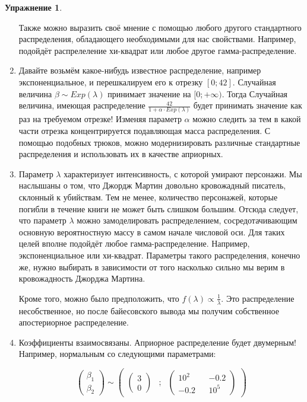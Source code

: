 \documentclass[12pt, a4paper, oneside]{extreport}
\def \b{\beta}
\theoremstyle{plain}              %
\theoremstyle{definition}         %
\newtheorem{problem}{\color{myblue} Упражнение}
\begin{document}
\begin{problem}
\begin{sol}
\begin{enumerate}
Также можно выразить своё мнение с помощью любого другого стандартного распределения, обладающего необходимыми для нас свойствами. Например, подойдёт распрелеление хи-квадрат или любое другое гамма-распределение.

\item Давайте возьмём какое-нибудь известное распределение, например экспоненциальное, и перешкалируем его к отрезку $[0;42]$. Случайная величина $\b \sim Exp(\lambda)$ принимает значение на $[0;+\infty)$. Тогда Случайная величина, имеющая распределение $\frac{42}{1 + \alpha \cdot Exp(\lambda)}$ будет принимать значение как раз на требуемом отрезке! Изменяя параметр $\alpha$ можно следить за тем в какой части отрезка концентрируется подавляющая масса распределения. С помощью подобных трюков, можно модернизировать различные стандартные распределения и использовать их в качестве априорных. 

\item Параметр $\lambda$ характеризует интенсивность, с которой умирают персонажи. Мы наслышаны о том, что Джордж Мартин довольно кровожадный писатель, склонный к убийствам. Тем не менее, количество персонажей, которые погибли в течение книги не может быть слишком большим. Отсюда следует, что параметр $\lambda$ можно замоделировать распределением, сосредотачивающим основную вероятностную массу в самом начале числовой оси. Для таких целей вполне подойдёт любое гамма-распределение. Например, экспоненциальное или хи-квадрат. Параметры такого распределения, конечно же, нужно выбирать в зависимости от того насколько сильно мы верим в кровожадность Джорджа Мартина.

Кроме того, можно было предположить, что $f(\lambda) \propto \frac{1}{\lambda}$. Это распределение несобственное, но после байесовского вывода мы получим собственное апостериорное распределение.

\item Коэффициенты взаимосвязаны. Априорное распределение будет двумерным! Например, нормальным со следующими параметрами: 

\begin{equation*}
\begin{pmatrix}
\b_1 \\
\b_2
\end{pmatrix} \sim 
\begin{pmatrix}
\begin{pmatrix}
3 \\
0
\end{pmatrix} &;& \begin{pmatrix}
10^2 & & -0.2 \\
-0.2 & & 10^5 
\end{pmatrix}
\end{pmatrix}
\end{equation*}




\end{enumerate}
\end{sol}
\end{problem}
\end{document}
